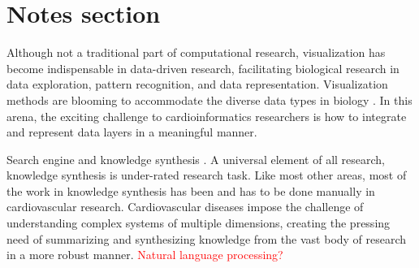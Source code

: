 \documentclass[letter]{bioinfo}
\newcommand{\comment}[1]{\textcolor{red}{#1}}
\begin{document}

	
	

	
	
	
	
	


	
	
	
	
	\section*{Notes section}
	
	Although not a traditional part of computational research, visualization has become indispensable in data-driven research, facilitating biological research in data exploration, pattern recognition, and data representation. Visualization methods are blooming to accommodate the diverse data types in biology \citep{Pavlopoulos:2015:Visualizing}. In this arena, the exciting challenge to cardioinformatics researchers is how to integrate and represent data layers in a meaningful manner.
		
		
	Search engine and knowledge synthesis \citep{Lutjohann:2011:Sciencenet}. A universal element of all research, knowledge synthesis is under-rated research task. Like most other areas, most of the work in knowledge synthesis has been and has to be done manually in cardiovascular research. Cardiovascular diseases impose the challenge of understanding complex systems of multiple dimensions, creating the pressing need of summarizing and synthesizing knowledge from the vast body of research in a more robust manner. \comment{Natural language processing?}
		
\end{document}
